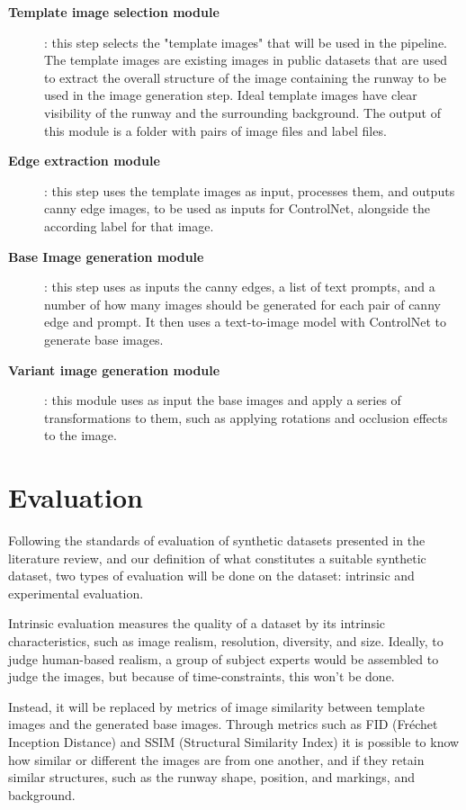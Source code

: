 \begin{description}
    \item[\textbf{Template image selection module}]: this step selects the "template images" that will be used in the pipeline. The template images are existing images in public datasets that are used to extract the overall structure of the image containing the runway to be used in the image generation step. Ideal template images have clear visibility of the runway and the surrounding background.  The output of this module is a folder with pairs of image files and label files.

    \item[\textbf{Edge extraction module}]: this step uses the template images as input, processes them, and outputs canny edge images, to be used as inputs for ControlNet, alongside the according label for that image.

    \item[\textbf{Base Image generation module}]: this step uses as inputs the canny edges, a list of text prompts, and a number of how many images should be generated for each pair of canny edge and prompt. It then uses a text-to-image model with ControlNet to generate base images.

    \item[\textbf{Variant image generation module}]: this module uses as input
      the base images and apply a series of transformations to them, such as
      applying rotations and occlusion effects to the image.
\end{description}

\section{Evaluation}

Following the standards of evaluation of synthetic datasets presented in the literature review, and our definition of what constitutes a suitable synthetic dataset, two types of evaluation will be done on the dataset: intrinsic and experimental evaluation.

Intrinsic evaluation measures the quality of a dataset by its intrinsic characteristics, such as image realism, resolution, diversity, and size. Ideally, to judge human-based realism, a group of subject experts would be assembled to judge the images, but because of time-constraints, this won't be done.

Instead, it will be replaced by metrics of image similarity between template
images and the generated base images. Through metrics such as FID (Fréchet
Inception Distance) and SSIM (Structural Similarity Index) it is possible to
know how similar or different the images are from one another, and if they
retain similar structures, such as the runway shape, position, and markings, and background.

